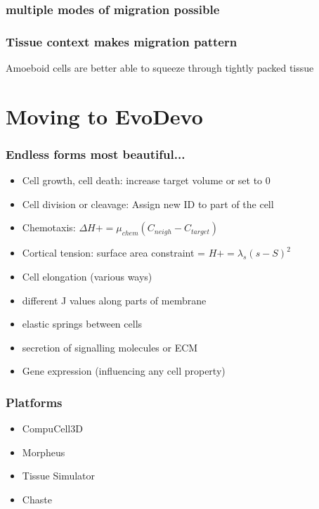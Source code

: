 \documentclass[compress]{beamer}
\begin{document}
\begin{frame}
\frametitle{multiple modes of migration possible} %
\end{frame}

\begin{frame}
\frametitle{Tissue context makes migration pattern} %
\begin{center}
\end{center}
\small Amoeboid cells are better able to squeeze through tightly packed tissue\\
\end{frame}

\section{Moving to EvoDevo}
\begin{frame}
\frametitle{Endless forms most beautiful...}   
\begin{itemize}
 \item Cell growth, cell death: increase target volume or set to 0
 \item Cell division or cleavage: Assign new ID to part of the cell
 \item Chemotaxis: $\Delta H += \mu_{chem}(C_{neigh}-C_{target})$
 \item Cortical tension: surface area constraint = $H += \lambda_{s}(s-S)^2$
 \item Cell elongation (various ways)
 \item different J values along parts of membrane
 \item elastic springs between cells
 \item secretion of signalling molecules or ECM
 \item Gene expression (influencing any cell property)
\end{itemize}
\end{frame}

\begin{frame}
\frametitle{Platforms}   
\begin{center}
\begin{itemize}
 \item CompuCell3D
 \item Morpheus
 \item Tissue Simulator
 \item Chaste
\end{itemize}

\end{center}

\end{frame}
\end{document}
